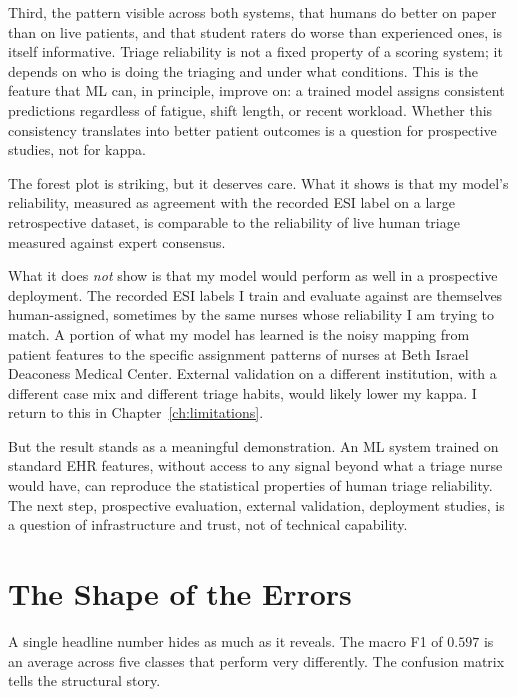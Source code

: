 Third, the pattern visible across both systems, that humans do better on paper than on live patients, and that student raters do worse than experienced ones, is itself informative. Triage reliability is not a fixed property of a scoring system; it depends on who is doing the triaging and under what conditions. This is the feature that ML can, in principle, improve on: a trained model assigns consistent predictions regardless of fatigue, shift length, or recent workload. Whether this consistency translates into better patient outcomes is a question for prospective studies, not for kappa.

\begin{remarkbox}
The forest plot is striking, but it deserves care. What it shows is that my model's reliability, measured as agreement with the recorded ESI label on a large retrospective dataset, is comparable to the reliability of live human triage measured against expert consensus.

What it does \emph{not} show is that my model would perform as well in a prospective deployment. The recorded ESI labels I train and evaluate against are themselves human-assigned, sometimes by the same nurses whose reliability I am trying to match. A portion of what my model has learned is the noisy mapping from patient features to the specific assignment patterns of nurses at Beth Israel Deaconess Medical Center. External validation on a different institution, with a different case mix and different triage habits, would likely lower my kappa. I return to this in Chapter~\ref{ch:limitations}.

But the result stands as a meaningful demonstration. An ML system trained on standard EHR features, without access to any signal beyond what a triage nurse would have, can reproduce the statistical properties of human triage reliability. The next step, prospective evaluation, external validation, deployment studies, is a question of infrastructure and trust, not of technical capability.
\end{remarkbox}

\section{The Shape of the Errors}

A single headline number hides as much as it reveals. The macro F1 of $0.597$ is an average across five classes that perform very differently. The confusion matrix tells the structural story.

